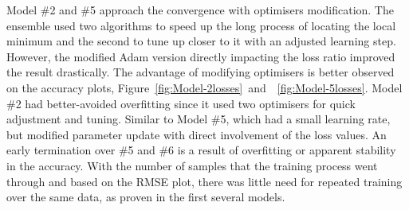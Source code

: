 %
%
Model \#2 and \#5 approach the convergence with optimisers modification.
The ensemble used two algorithms to speed up the long process of locating the local minimum and the second to tune up closer to it with an adjusted learning step.
However, the modified Adam version directly impacting the loss ratio improved the result drastically.
The advantage of modifying optimisers is better observed on the accuracy plots, \mbox{Figure~\ref{fig:Model-2losses} and ~\ref{fig:Model-5losses}}.
Model \#2 had better-avoided overfitting since it used two optimisers for quick adjustment and tuning.
Similar to Model \#5, which had a small learning rate, but modified parameter update with direct involvement of the loss values.
An early termination over \#5 and \#6 is a result of overfitting or apparent stability in the accuracy.
With the number of samples that the training process went through and based on the RMSE plot, there was little need for repeated training over the same data, as proven in the first several models.

%

